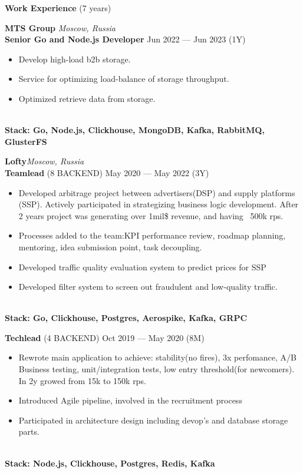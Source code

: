 \documentclass{resume} %
\begin{document}
\begin{rSection}{\textbf{Work Experience} (7 years) }

\textbf{MTS Group} \hfill \textit{Moscow, Russia} \\
\textbf{Senior Go and Node.js Developer}  \hfill Jun 2022 --- Jun 2023 (1Y)
\begin{itemize}
    \setlength\itemsep{-0.4em}
    \item Develop high-load b2b storage.
    \item Service for optimizing load-balance of storage throughput.
    \item Optimized retrieve data from storage.
\end{itemize}
\\\textbf{Stack: Go, Node.js, Clickhouse, MongoDB, Kafka, RabbitMQ, GlusterFS}

\textbf{Lofty}\hfill \textit{Moscow, Russia} \\
\textbf{Teamlead} (8 BACKEND) \hfill May 2020 --- May 2022 (3Y)
\begin{itemize}
    \setlength\itemsep{-0.4em}
    \item Developed arbitrage project between advertisers(DSP) and supply platforms (SSP). Actively participated in strategizing
    	   business logic development.
    	   After 2 years project was generating over 1mil\$ revenue, and having ~500k rps.
    \item Processes added to the team:KPI performance review, roadmap planning, mentoring, idea submission point, task decoupling.
    \item Developed traffic quality evaluation system to predict prices for SSP
    \item Developed filter system to screen out fraudulent and low-quality traffic.
\end{itemize}
\\\textbf{Stack: Go, Clickhouse, Postgres, Aerospike, Kafka, GRPC}

\textbf{Techlead} (4 BACKEND) \hfill Oct 2019 --- May 2020 (8M)
\begin{itemize}
    \setlength\itemsep{-0.4em}
    \item Rewrote main application to achieve: stability(no fires), 3x perfomance, A/B Business testing, unit/integration tests, low
    	    entry threshold(for newcomers).
    	    In 2y growed from 15k to 150k rps.
    \item Introduced Agile pipeline, involved in the recruitment process
    \item Participated in architecture design including devop's and database storage parts.
\end{itemize}
\\\textbf{Stack: Node.js, Clickhouse, Postgres, Redis, Kafka}


\end{rSection}
\end{document}
